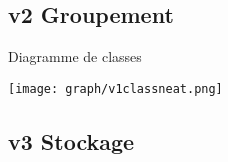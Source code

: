 \documentclass{beamer}
\begin{document}
        \subsection{v2 Groupement}
                \begin{block}{Diagramme de classes}
                    \begin{center}
                        \texttt{[image: graph/v1classneat.png]}
                    \end{center}
                \end{block}
        \subsection{v3 Stockage}
\end{document}

